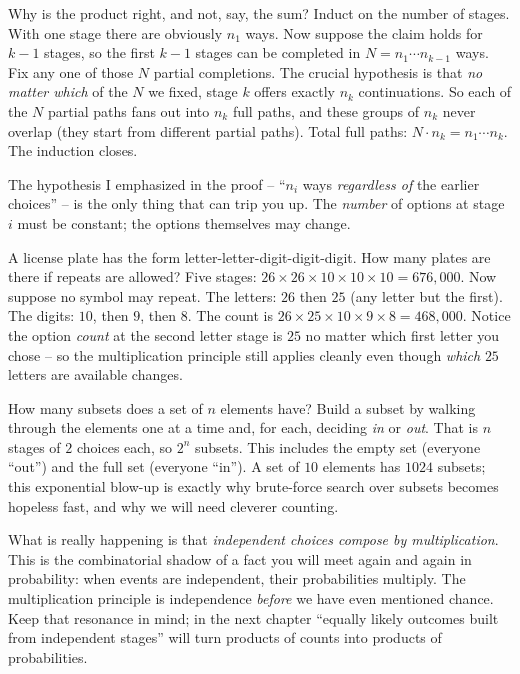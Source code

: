 \begin{whybox}
Why is the product right, and not, say, the sum? Induct on the number of stages. With one
stage there are obviously $n_1$ ways. Now suppose the claim holds for $k-1$ stages, so the
first $k-1$ stages can be completed in $N = n_1 \cdots n_{k-1}$ ways. Fix any one of those
$N$ partial completions. The crucial hypothesis is that \emph{no matter which} of the $N$
we fixed, stage $k$ offers exactly $n_k$ continuations. So each of the $N$ partial paths
fans out into $n_k$ full paths, and these groups of $n_k$ never overlap (they start from
different partial paths). Total full paths: $N \cdot n_k = n_1 \cdots n_k$. The induction
closes.
\end{whybox}

The hypothesis I emphasized in the proof -- ``$n_i$ ways \emph{regardless of} the earlier
choices'' -- is the only thing that can trip you up. The \emph{number} of options at stage
$i$ must be constant; the options themselves may change.

\begin{example}
\label{ch2:ex-plates}
A license plate has the form letter-letter-digit-digit-digit. How many plates are there
if repeats are allowed? Five stages: $26 \times 26 \times 10 \times 10 \times 10 =
676{,}000$. Now suppose no symbol may repeat. The letters: $26$ then $25$ (any letter but
the first). The digits: $10$, then $9$, then $8$. The count is $26 \times 25 \times 10
\times 9 \times 8 = 468{,}000$. Notice the option \emph{count} at the second letter stage
is $25$ no matter which first letter you chose -- so the multiplication principle still
applies cleanly even though \emph{which} $25$ letters are available changes.
\end{example}

\begin{example}
\label{ch2:ex-subsets}
How many subsets does a set of $n$ elements have? Build a subset by walking through the
elements one at a time and, for each, deciding \emph{in} or \emph{out}. That is $n$ stages
of $2$ choices each, so $2^n$ subsets. This includes the empty set (everyone ``out'') and
the full set (everyone ``in''). A set of $10$ elements has $1024$ subsets; this exponential
blow-up is exactly why brute-force search over subsets becomes hopeless fast, and why we
will need cleverer counting.
\end{example}

\begin{happeningbox}
What is really happening is that \emph{independent choices compose by multiplication}.
This is the combinatorial shadow of a fact you will meet again and again in probability:
when events are independent, their probabilities multiply. The multiplication principle is
independence \emph{before} we have even mentioned chance. Keep that resonance in mind; in
the next chapter ``equally likely outcomes built from independent stages'' will turn
products of counts into products of probabilities.
\end{happeningbox}

